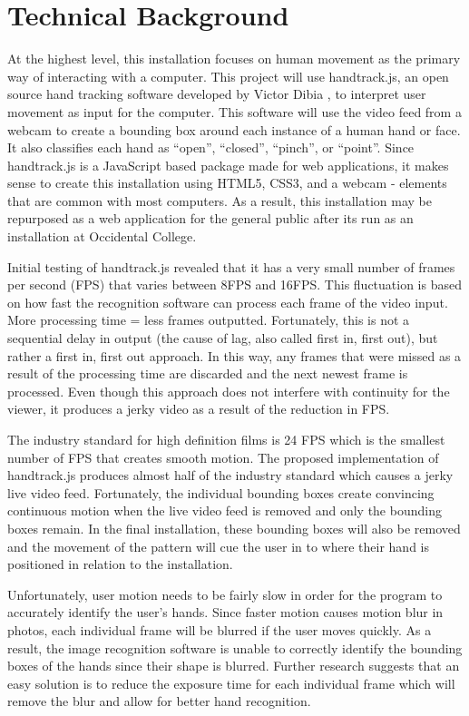 \documentclass[10pt,twocolumn]{article}
\begin{document}
\section{Technical Background}
At the highest level, this installation focuses on human movement as the primary way of interacting with a computer.  This project will use handtrack.js, an open source hand tracking software developed by Victor Dibia \cite{noauthor_handtrackjs_nodate-1}, to interpret user movement as input for the computer.  This software will use the video feed from a webcam to create a bounding box around each instance of a human hand or face.  It also classifies each hand as ``open'', ``closed'', ``pinch'', or ``point''.  Since handtrack.js is a JavaScript based package made for web applications, it makes sense to create this installation using HTML5, CSS3, and a webcam - elements that are common with most computers.   As a result, this installation may be repurposed as a web application for the general public after its run as an installation at Occidental College. 

Initial testing of handtrack.js revealed that it has a very small number of frames per second (FPS) that varies between 8FPS and 16FPS.  This fluctuation is based on how fast the recognition software can process each frame of the video input. More processing time = less frames outputted.  Fortunately, this is not a sequential delay in output (the cause of lag, also called first in, first out), but rather a first in, first out approach.  In this way, any frames that were missed as a result of the processing time are discarded and the next newest frame is processed.  Even though this approach does not interfere with continuity for the viewer, it produces a jerky video as a result of the reduction in FPS.  

The industry standard for high definition films is 24 FPS \cite{noauthor_3_nodate} which is the smallest number of FPS that creates smooth motion.  The proposed implementation of handtrack.js produces almost half of the industry standard which causes a jerky live video feed.  Fortunately, the individual bounding boxes create convincing continuous motion when the live video feed is removed and only the bounding boxes remain. In the final installation, these bounding boxes will also be removed and the movement of the pattern will cue the user in to where their hand is positioned in relation to the installation.  

Unfortunately, user motion needs to be fairly slow in order for the program to accurately identify the user's hands.  Since faster motion causes motion blur in photos, each individual frame will be blurred if the user moves quickly. As a result, the image recognition software is unable to correctly identify the bounding boxes of the hands since their shape is blurred. Further research suggests that an easy solution is to reduce the exposure time for each individual frame which will remove the blur \cite{e_adjusting_2019} and allow for better hand recognition.   
\end{document}

